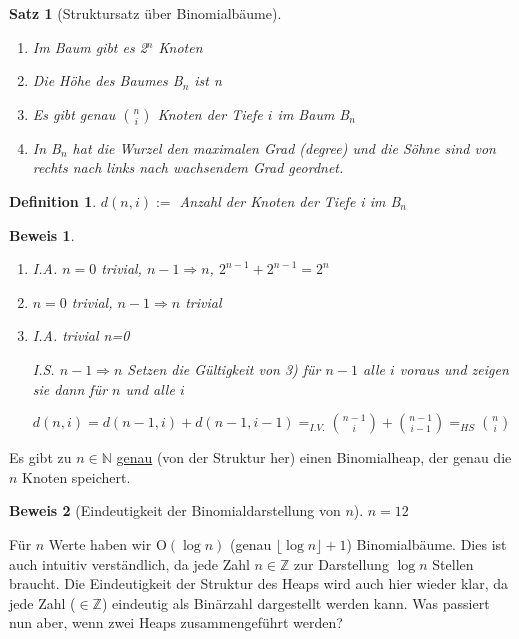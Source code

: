 \documentclass[ngerman,draft,parskip=half*,twoside]{scrreprt}
\theoremstyle{break}
\newtheorem{beweis}{Beweis}
\newtheorem{definition}{Definition}
\newtheorem{satz}{Satz}
\begin{document}
\begin{satz}[Struktursatz über Binomialbäume]
\begin{enumerate}
\item Im Baum gibt es 2$^n$ Knoten
\item Die Höhe des Baumes B$_n$ ist n
\item Es gibt genau $\binom{n}{i}$ Knoten der Tiefe $i$ im Baum B$_n$
\item In B$_n$ hat die Wurzel den maximalen Grad (degree) und die Söhne sind von rechts nach links nach wachsendem Grad
geordnet.
\end{enumerate}
\end{satz}

\begin{definition}
$d(n,i):=$ Anzahl der Knoten der Tiefe i im B$_n$
\end{definition}

\begin{beweis}
\begin{enumerate}
\item I.A. $n=0$ trivial, $n-1 \Rightarrow n$, $2^{n-1}+2^{n-1}=2^n$ 
\item $n=0$ trivial, $n-1 \Rightarrow n$ trivial
\item 

I.A. trivial n=0

I.S. $n-1 \Rightarrow n$ Setzen die Gültigkeit von 3) für $n-1$ alle $i$ voraus und zeigen sie dann für $n$ und alle
$i$

$d(n,i)=d(n-1,i)+d(n-1,i-1)=_{I.V.} \binom{n-1}{i}+ \binom{n-1}{i-1}=_{HS} \binom{n}{i}$
\end{enumerate}
\end{beweis}

Es gibt zu $n \in \mathbb{N}$ \underline{genau} (von der Struktur her) einen Binomialheap, der genau die $n$ Knoten
speichert.
 
\begin{beweis}[Eindeutigkeit der Binomialdarstellung von $n$]
$n=12$ 
\end{beweis} 

\begin{figure}[H]
  \centering
   
  
  \end{figure}
  
Für $n$ Werte haben wir O$(\log n)$ (genau $\lfloor \log n \rfloor +1$) Binomialbäume. Dies ist auch intuitiv
verständlich, da jede Zahl $n \in \mathbb{Z}$ zur Darstellung $\log n$ Stellen braucht. Die Eindeutigkeit der Struktur
des Heaps wird auch hier wieder klar, da jede Zahl ($\in \mathbb{Z}$) eindeutig als Binärzahl dargestellt werden kann.
Was passiert nun aber, wenn zwei Heaps zusammengeführt werden?
\end{document}
